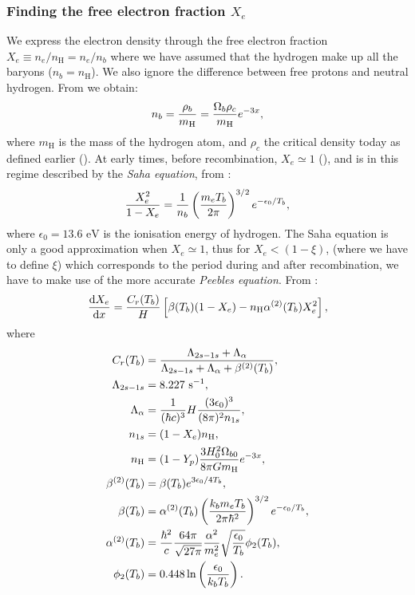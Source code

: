     \subsubsection{Finding the free electron fraction $X_e$}
    We express the electron density through the free electron fraction $X_e \equiv n_e/n_\mathrm{H} = n_e/n_b$ where we have assumed that the hydrogen make up all the baryons ($n_b=n_\mathrm{H}$). We also ignore the difference between free protons and neutral hydrogen. From \cite{https://doi.org/10.48550/arxiv.astro-ph/0606683} we obtain:
    \begin{equation}
        n_b = \frac{\rho_b}{m_\mathrm{H}} = \frac{\Omega_b\rho_c}{m_\mathrm{H}}e^{-3x},
    \end{equation}
    where $m_\mathrm{H}$ is the mass of the hydrogen atom, and $\rho_c$ the critical density today as defined earlier (). At early times, before recombination, $X_e \simeq 1$ (), and is in this regime described by the \textit{Saha equation}, from \cite{dodelson2020modern}:
    \begin{equation}\label{eq:m2:theory:Saha_equation}
        \frac{X_e^2}{1-X_e} = \frac{1}{n_b}\left(\frac{m_eT_b}{2\pi}\right)^{3/2}e^{-\epsilon_0/T_b},
    \end{equation}
    where $\epsilon_0 = 13.6\text{ eV}$ is the ionisation energy of hydrogen. The Saha equation is only a good approximation when $X_e \simeq 1$, thus for $X_e < (1-\xi)$, (where we have to define $\xi$) which corresponds to the period during and after recombination, we have to make use of the more accurate \textit{Peebles equation}. From \cite{https://doi.org/10.48550/arxiv.astro-ph/0606683}:
    \begin{equation}\label{eq:m2:theory:peebles_equation}
        \dv{X_e}{x} = \frac{C_r(T_b)}{H}\left[\beta(T_b)(1-X_e)-n_\mathrm{H}\alpha^{(2)}(T_b)X_e^2\right],
    \end{equation}
    where
    \begin{equation}
        \begin{split}
            C_r(T_b) &= \frac{\Lambda_{2s-1s}+\Lambda_\alpha}{\Lambda_{2s-1s} + \Lambda_\alpha+\beta^{(2)}(T_b)}, \\
            \Lambda_{2s-1s} &= 8.227 \text{ {s}}^{-1}, \\
            \Lambda_\alpha &= \frac{1}{(\hbar c)^3}H\frac{(3\epsilon_0)^3}{(8\pi)^2n_{1s}}, \\
            n_{1s} &=(1-X_e)n_\mathrm{H}, \\
            n_\mathrm{H} &= (1-Y_p)\frac{3H_0^2\Omega_{b0}}{8\pi Gm_\mathrm{H}}e^{-3x},\\
            \beta^{(2)}(T_b) &= \beta(T_b)e^{3\epsilon_0/4T_b}, \\
            \beta(T_b) &= \alpha^{(2)}(T_b)\left(\frac{k_bm_eT_b}{2\pi\hbar^2}\right)^{3/2}e^{-\epsilon_0/T_b}, \\
            \alpha^{(2)}(T_b) &=\frac{\hbar^2}{c}\frac{64\pi}{\sqrt{27\pi}}\frac{\alpha^2}{m_e^2}\sqrt{\frac{\epsilon_0}{T_b}}\phi_2(T_b), \\
            \phi_2(T_b) &= 0.448\ln\left(\frac{\epsilon_0}{k_bT_b}\right).
        \end{split}
    \end{equation}
